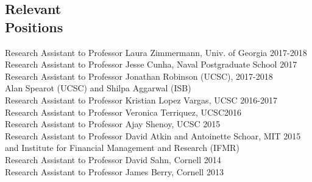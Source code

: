 \documentclass[letterpaper, margin, 10pt]{res} %
\newcommand{\blank}[1]{\hspace*{#1}\linebreak[0]}
\begin{document}
\begin{resume}
\normalsize
\section{\sc \textbf{Relevant \\ Positions}}

Research Assistant to Professor Laura Zimmermann, Univ. of Georgia \hfill 2017-2018 \\
Research Assistant to Professor Jesse Cunha, Naval Postgraduate School \hfill 2017 \\
Research Assistant to Professor Jonathan Robinson (UCSC), \hfill 2017-2018 \\ 
 \blank{0.5cm} Alan Spearot (UCSC) and Shilpa Aggarwal (ISB) \\
Research Assistant to Professor Kristian Lopez Vargas, UCSC \hfill 2016-2017 \\
Research Assistant to Professor Veronica Terriquez, UCSC\hfill 2016 \\
Research Assistant to Professor Ajay Shenoy, UCSC \hfill 2015 \\
Research Assistant to Professor David Atkin and Antoinette Schoar, MIT \hfill 2015 \\ \blank{0.5cm} and Institute for Financial Management and Research (IFMR) \\
Research Assistant to Professor David Sahn, Cornell \hfill 2014 \\
Research Assistant to Professor James Berry, Cornell \hfill 2013 


\end{resume}
\end{document}
